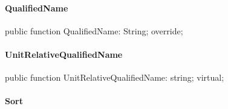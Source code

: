 \documentclass{report}
\newif\ifpdf
\begin{document}
\paragraph*{QualifiedName}\hspace*{\fill}

\label{PasDoc_Items.TPasItem-QualifiedName}
\begin{list}{}{
\setlength{\itemindent}{0cm}
\setlength{\listparindent}{0cm}
\setlength{\leftmargin}{\evensidemargin}
\addtolength{\leftmargin}{\tmplength}
\settowidth{\labelsep}{X}
\addtolength{\leftmargin}{\labelsep}
\setlength{\labelwidth}{\tmplength}
}
\item[\textbf{Declaration}\hfill]
\ifpdf
\begin{flushleft}
\fi
\begin{ttfamily}
public function QualifiedName: String; override;\end{ttfamily}

\ifpdf
\end{flushleft}
\fi

\end{list}
\paragraph*{UnitRelativeQualifiedName}\hspace*{\fill}

\label{PasDoc_Items.TPasItem-UnitRelativeQualifiedName}
\begin{list}{}{
\setlength{\itemindent}{0cm}
\setlength{\listparindent}{0cm}
\setlength{\leftmargin}{\evensidemargin}
\addtolength{\leftmargin}{\tmplength}
\settowidth{\labelsep}{X}
\addtolength{\leftmargin}{\labelsep}
\setlength{\labelwidth}{\tmplength}
}
\item[\textbf{Declaration}\hfill]
\ifpdf
\begin{flushleft}
\fi
\begin{ttfamily}
public function UnitRelativeQualifiedName: string; virtual;\end{ttfamily}

\ifpdf
\end{flushleft}
\fi

\end{list}
\paragraph*{Sort}\hspace*{\fill}
\end{document}
